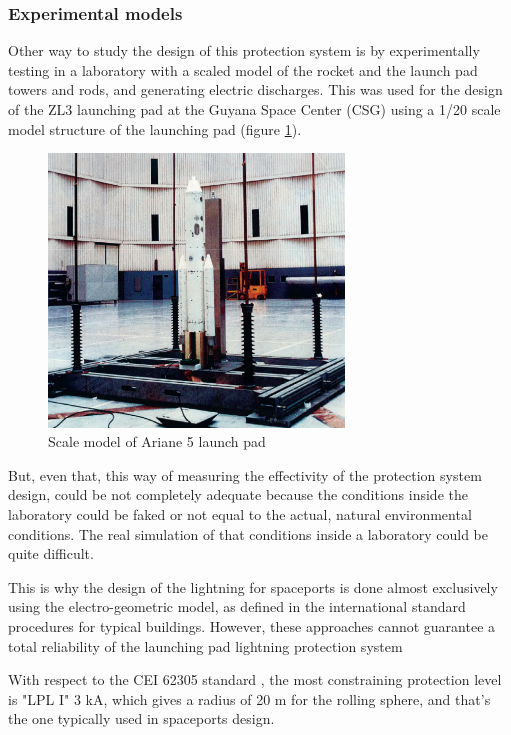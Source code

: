 \subsubsection{Experimental models}

Other way to study the design of this protection system is by experimentally testing
in a laboratory with a scaled model of the rocket and the launch pad towers and
rods, and generating electric discharges. This was used for the design of the ZL3
launching pad at the Guyana Space Center (CSG) using a 1/20 scale model structure
of the launching pad (figure \ref{fig:model_ariane}).

\begin{figure}[h!]
	\centering
	\includegraphics[width=0.7\textwidth]{img/model_ariane.png}
	\caption{Scale model of Ariane 5 launch pad}
	\label{fig:model_ariane}
\end{figure}

But, even that, this way of measuring the effectivity of the protection system
design, could be not completely adequate because the conditions inside the laboratory
could be faked or not equal to the actual, natural environmental conditions. The
real simulation of that conditions inside a laboratory could be quite difficult.

This is why the design of the lightning for spaceports is done almost exclusively
using the electro-geometric model, as defined in the international standard procedures
for typical buildings. However, these approaches cannot guarantee a total reliability of the
launching pad lightning protection system

With respect to the CEI 62305 standard \cite{ligthning_standard}, the most constraining
protection level is "LPL I" 3 kA, which gives a radius of 20 m for the rolling sphere,
and that's the one typically used in spaceports design.

